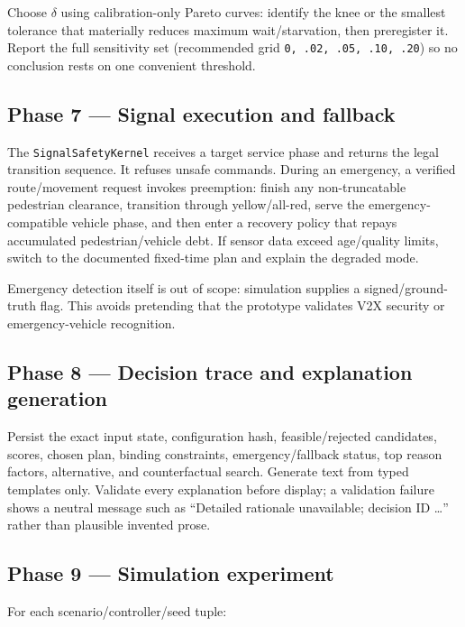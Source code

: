 \documentclass[
  english,
  11pt,
  a4paper,
]{article}
\begin{document}
Choose \(\delta\) using calibration-only Pareto curves: identify the knee or
the smallest tolerance that materially reduces maximum wait/starvation,
then preregister it. Report the full sensitivity set (recommended grid
\texttt{0,\ .02,\ .05,\ .10,\ .20}) so no conclusion rests on one
convenient threshold.

\subsection{Phase 7 --- Signal execution and
fallback}\label{phase-7-signal-execution-and-fallback}

The \texttt{SignalSafetyKernel} receives a target service phase and
returns the legal transition sequence. It refuses unsafe commands.
During an emergency, a verified route/movement request invokes
preemption: finish any non-truncatable pedestrian clearance, transition
through yellow/all-red, serve the emergency-compatible vehicle phase,
and then enter a recovery policy that repays accumulated
pedestrian/vehicle debt. If sensor data exceed age/quality limits,
switch to the documented fixed-time plan and explain the degraded mode.

Emergency detection itself is out of scope: simulation supplies a
signed/ground-truth flag. This avoids pretending that the prototype
validates V2X security or emergency-vehicle recognition.

\subsection{Phase 8 --- Decision trace and explanation
generation}\label{phase-8-decision-trace-and-explanation-generation}

Persist the exact input state, configuration hash, feasible/rejected
candidates, scores, chosen plan, binding constraints, emergency/fallback
status, top reason factors, alternative, and counterfactual search.
Generate text from typed templates only. Validate every explanation
before display; a validation failure shows a neutral message such as
``Detailed rationale unavailable; decision ID \ldots'' rather than
plausible invented prose.

\subsection{Phase 9 --- Simulation
experiment}\label{phase-9-simulation-experiment}

For each scenario/controller/seed tuple:
\end{document}
